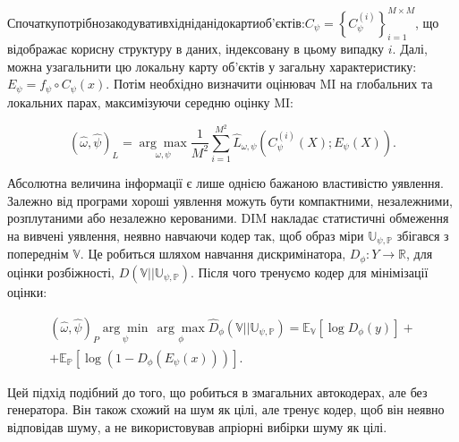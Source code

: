 Спочатку\hfill потрібно\hfill закодувати\hfill вхідні\hfill дані\hfill до\hfill карти\hfill об’єктів:\newline $C_{\psi} = \left\{ C_{\psi}^{(i)} \right\}_{i=1}^{M \times M}$, що відображає корисну структуру в даних, індексовану в цьому випадку $i$. Далі, можна узагальнити цю локальну карту об’єктів у загальну характеристику: $E_{\psi} = f_{\psi} \circ C_{\psi}(x)$. Потім необхідно визначити оцінювач MI на глобальних та локальних парах, максимізуючи середню оцінку MI:

\begin{equation}\label{eq:max_mi}
(\hat{\omega}, \hat{\psi})_{L} = \underset{\omega,\psi}{\arg\max}\frac{1}{M^{2}}\sum_{i=1}^{M^{2}}\hat{L}_{\omega, \psi}(C_{\psi}^{(i)}(X); E_{\psi}(X)).
\end{equation}

\vspace{1.5em}


Абсолютна величина інформації є лише однією бажаною властивістю уявлення. Залежно від програми хороші уявлення можуть бути компактними, незалежними, розплутаними або незалежно керованими. DIM накладає статистичні обмеження на вивчені уявлення, неявно навчаючи кодер так, щоб образ міри $\mathbb{U_{\psi, P}}$ збігався з попереднім $\mathbb{V}$. Це робиться шляхом навчання дискримінатора, $D_{\phi} : Y \rightarrow \mathbb{R}$, для оцінки розбіжності, $D(\mathbb{V} || \mathbb{U_{\psi, P}})$. Після чого тренуємо кодер для мінімізації оцінки:

\begin{equation}\label{eq:div}
\begin{aligned}
(\hat{\omega}, \hat{\psi})_{P} \underset{\psi}{\arg\min}\,\underset{\phi}{\arg\max}\hat{D}_{\phi}(\mathbb{V}||\mathbb{U_{\psi,P}}) = \mathbb{E_{V}}[\log{D_{\phi}(y)}] + \\ + \mathbb{E_{P}}[\log{(1-D_{\phi}(E_{\psi}(x)))}].
\end{aligned}
\end{equation}

\vspace{1.5em}

Цей підхід подібний до того, що робиться в змагальних автокодерах, але без генератора. Він також схожий на шум як цілі, але тренує кодер, щоб він неявно відповідав шуму, а не використовував апріорні вибірки шуму як цілі.

